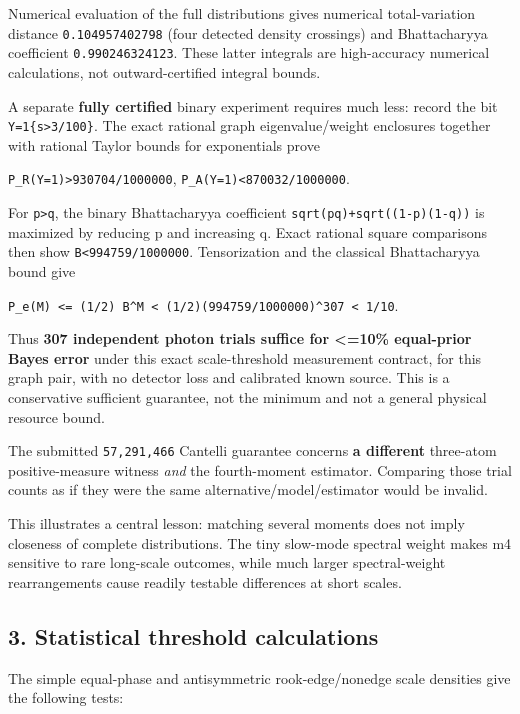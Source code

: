 \documentclass[
  10pt,
  a4paper,
]{article}
\begin{document}
Numerical evaluation of the full distributions gives numerical total-variation distance \texttt{0.104957402798} (four detected density crossings) and Bhattacharyya coefficient \texttt{0.990246324123}. These latter integrals are high-accuracy numerical calculations, not outward-certified integral bounds.

A separate \textbf{fully certified} binary experiment requires much less: record the bit \texttt{Y=1\{s\textgreater{}3/100\}}. The exact rational graph eigenvalue/weight enclosures together with rational Taylor bounds for exponentials prove

\texttt{P\_R(Y=1)\textgreater{}930704/1000000}, \texttt{P\_A(Y=1)\textless{}870032/1000000}.

For \texttt{p\textgreater{}q}, the binary Bhattacharyya coefficient \texttt{sqrt(pq)+sqrt((1-p)(1-q))} is maximized by reducing p and increasing q. Exact rational square comparisons then show \texttt{B\textless{}994759/1000000}. Tensorization and the classical Bhattacharyya bound give

\texttt{P\_e(M)\ \textless{}=\ (1/2)\ B\^{}M\ \textless{}\ (1/2)(994759/1000000)\^{}307\ \textless{}\ 1/10}.

Thus \textbf{307 independent photon trials suffice for \textless=10\% equal-prior Bayes error} under this exact scale-threshold measurement contract, for this graph pair, with no detector loss and calibrated known source. This is a conservative sufficient guarantee, not the minimum and not a general physical resource bound.

The submitted \texttt{57,291,466} Cantelli guarantee concerns \textbf{a different} three-atom positive-measure witness \emph{and} the fourth-moment estimator. Comparing those trial counts as if they were the same alternative/model/estimator would be invalid.

This illustrates a central lesson: matching several moments does not imply closeness of complete distributions. The tiny slow-mode spectral weight makes m4 sensitive to rare long-scale outcomes, while much larger spectral-weight rearrangements cause readily testable differences at short scales.

\subsection{3. Statistical threshold calculations}\label{statistical-threshold-calculations}

The simple equal-phase and antisymmetric rook-edge/nonedge scale densities give the following tests:
\end{document}
